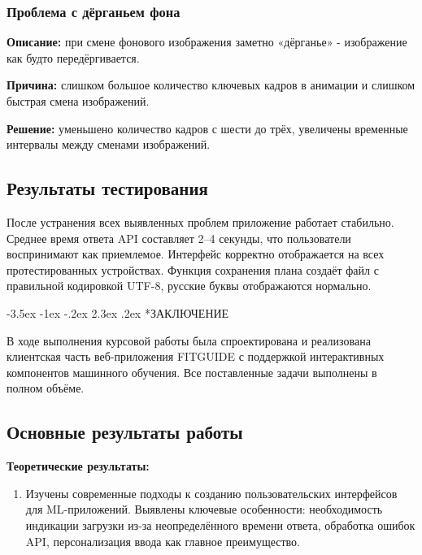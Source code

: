 \documentclass[14pt, a4paper]{extarticle}
\makeatletter
\renewcommand\section{\@startsection {section}{1}{\z@}%
{-3.5ex \@plus -1ex \@minus -.2ex}%
{2.3ex \@plus.2ex}%
{\centering\normalfont\Large\bfseries}}
\makeatother
\begin{document}
\begin{enumerate}
\subsubsection{Проблема с дёрганьем фона}

\noindent \textbf{Описание:} при смене фонового изображения заметно «дёрганье» - изображение как будто передёргивается.

\medskip
\noindent \textbf{Причина:} слишком большое количество ключевых кадров в анимации и слишком быстрая смена изображений.

\medskip
\noindent \textbf{Решение:} уменьшено количество кадров с шести до трёх, увеличены временные интервалы между сменами изображений.

\subsection{Результаты тестирования}

\noindent После устранения всех выявленных проблем приложение работает стабильно. Среднее время ответа API составляет 2–4 секунды, что пользователи воспринимают как приемлемое. Интерфейс корректно отображается на всех протестированных устройствах. Функция сохранения плана создаёт файл с правильной кодировкой UTF-8, русские буквы отображаются нормально.

\newpage
{}
\section*{ЗАКЛЮЧЕНИЕ}

\noindent В ходе выполнения курсовой работы была спроектирована и реализована клиентская часть веб-приложения FITGUIDE с поддержкой интерактивных компонентов машинного обучения. Все поставленные задачи выполнены в полном объёме.

\subsection*{Основные результаты работы}

\noindent \textbf{Теоретические результаты:}
\begin{enumerate}
\item Изучены современные подходы к созданию пользовательских интерфейсов для ML-приложений. Выявлены ключевые особенности: необходимость индикации загрузки из-за неопределённого времени ответа, обработка ошибок API, персонализация ввода как главное преимущество.


\end{enumerate}
\end{enumerate}
\end{document}
